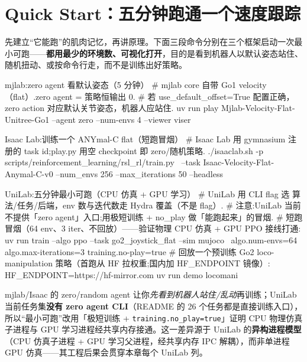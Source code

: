 \section{Quick Start：五分钟跑通一个速度跟踪}
\label{sec:rlmc-ql-quickstart}

先建立“它能跑”的肌肉记忆，再讲原理。下面三段命令分别在三个框架启动一次最小可跑——\textbf{都用最少的环境数、可视化打开}，目的是看到机器人以默认姿态站住、随机扭动、或按命令行走，而不是训练出好策略。

\begin{codebox}[bash]{mjlab:zero agent 看默认姿态（5 分钟）}
# mjlab core 自带 Go1 velocity（flat）.zero agent = 策略恒输出 0.
# 若 use_default_offset=True 配置正确，zero action 对应默认关节姿态，机器人应站住.
uv run play Mjlab-Velocity-Flat-Unitree-Go1 --agent zero --num-envs 4 --viewer viser
\end{codebox}

\begin{codebox}[bash]{Isaac Lab:训练一个 ANYmal-C flat（短跑冒烟）}
# Isaac Lab 用 gymnasium 注册的 task id;play.py 用空 checkpoint 即 zero/随机策略.
./isaaclab.sh -p scripts/reinforcement_learning/rsl_rl/train.py \
  --task Isaac-Velocity-Flat-Anymal-C-v0 --num_envs 256 --max_iterations 50 --headless
\end{codebox}

\begin{codebox}[bash]{UniLab:五分钟最小可跑（CPU 仿真 + GPU 学习）}
# UniLab 用 CLI flag 选 算法/任务/后端，env 数与迭代数走 Hydra 覆盖（不是 flag）.
# 注意:UniLab 当前不提供「zero agent」入口;用极短训练 + no_play 做「能跑起来」的冒烟.
# 短跑冒烟（64 env、3 iter、不回放）——验证物理 CPU 仿真 + GPU PPO 接线打通:
uv run train --algo ppo --task go2_joystick_flat --sim mujoco \
    algo.num-envs=64 algo.max-iterations=3 training.no-play=true
# 回放一个预训练 Go2 loco-manipulation 策略（首跑从 HF 拉权重;国内加 HF_ENDPOINT 镜像）:
HF_ENDPOINT=https://hf-mirror.com uv run demo locomani
\end{codebox}

\begin{note}
mjlab/Isaac 的 zero/random agent 让你\emph{先看到机器人站住/乱动}再训练；UniLab 当前任务集\textbf{没有 zero agent CLI}（README 的 26 个任务都是直接训练入口），所以“最小可跑”改用「极短训练 + \texttt{training.\allowbreak no\_play=true}」证明 CPU 物理仿真子进程与 GPU 学习进程经共享内存接通。这一差异源于 UniLab 的\textbf{异构进程模型}（CPU 仿真子进程 + GPU 学习父进程，经共享内存 IPC 解耦），而非单进程 GPU 仿真——其工程后果会贯穿本章每个 UniLab 列。
\end{note}

